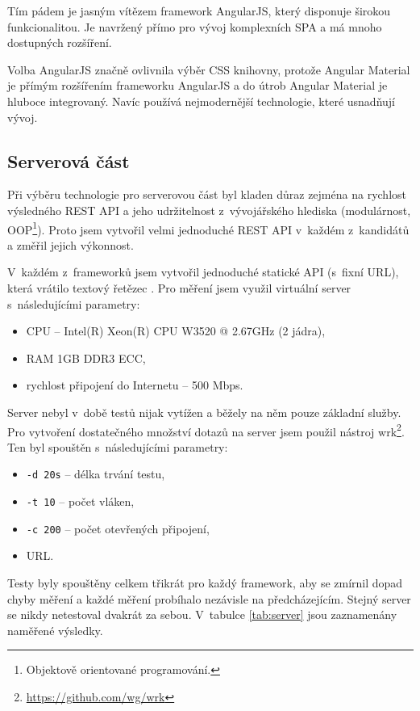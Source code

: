 Tím pádem je jasným vítězem framework AngularJS, který disponuje širokou funkcionalitou. Je navržený přímo pro vývoj komplexních SPA a má mnoho dostupných rozšíření.

Volba AngularJS značně ovlivnila výběr CSS knihovny, protože Angular Material je přímým rozšířením frameworku AngularJS a do útrob Angular Material je hluboce integrovaný. Navíc používá nejmodernější technologie, které usnadňují vývoj.

\subsection{Serverová část}
\label{serv:fin}

Při výběru technologie pro serverovou část byl kladen důraz zejména na rychlost výsledného REST API a jeho udržitelnost z~vývojářského hlediska (modulárnost, OOP\footnote{Objektově orientované programování.}). Proto jsem vytvořil velmi jednoduché REST API v~každém z~kandidátů a změřil jejich výkonnost.

V~každém z~frameworků jsem vytvořil jednoduché statické API (s~fixní URL), která vrátilo textový řetězec . Pro měření jsem využil virtuální server s~následujícími parametry:

\begin{itemize}
    \item CPU -- Intel(R) Xeon(R) CPU W3520  @ 2.67GHz (2 jádra),
    \item RAM 1GB DDR3 ECC,
    \item rychlost připojení do Internetu -- 500 Mbps.
\end{itemize}

Server nebyl v~době testů nijak vytížen a běžely na něm pouze základní služby. Pro vytvoření dostatečného množství dotazů na server jsem použil nástroj wrk\footnote{\url{https://github.com/wg/wrk}}. Ten byl spouštěn s~následujícími parametry:

\begin{itemize}
    \item \texttt{-d 20s} -- délka trvání testu,
    \item \texttt{-t 10} -- počet vláken,
    \item \texttt{-c 200} -- počet otevřených připojení,
    \item URL.
\end{itemize}

Testy byly spouštěny celkem třikrát pro každý framework, aby se zmírnil dopad chyby měření a každé měření probíhalo nezávisle na předcházejícím. Stejný server se nikdy netestoval dvakrát za sebou. V~tabulce \ref{tab:server} jsou zaznamenány naměřené výsledky.

